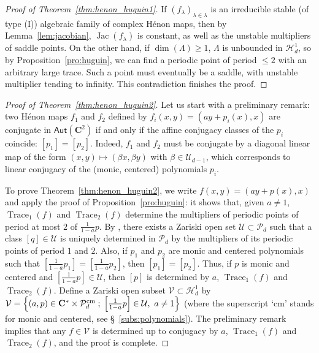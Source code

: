 \documentclass[oneside, 12pt]{amsart}
\newcommand{\set}[1]{\left\{#1\right\}}
\newcommand{\unsur}[1]{\frac{1}{#1}}
\newcommand{\inv}{^{-1}}
\DeclareMathOperator{\jac}{Jac}
\DeclareMathOperator{\Trace}{Trace}
\newcommand{\C}{\mathbf{C}}
\newcommand{\Aut}{\mathsf{Aut}}
\theoremstyle{plain}
\theoremstyle{definition}
\numberwithin{equation}{section}       %
\numberwithin{equation}{section}       %
\begin{document}
\begin{proof}[Proof of Theorem~\ref{thm:henon_huguin1}]
If $(f_\lambda)_{\lambda\in \lambda}$ is an irreducible stable (of type (I)) algebraic family of complex Hénon maps, 
then by Lemma~\ref{lem:jacobian}, $\jac(f_\lambda)$ is constant, as well as the unstable 
multipliers of saddle points. On the other hand, if  $\dim(\Lambda)\geq 1$, $\Lambda$ is unbounded in 
$\mathcal H^1_d$, so by Proposition~\ref{pro:huguin},   we can find a periodic point of period $\leq 2$ with 
an arbitrary large trace. Such a point must eventually be a saddle, with unstable multiplier tending to infinity. This contradiction finishes the proof. 
\end{proof}

\begin{proof}[Proof of Theorem~\ref{thm:henon_huguin2}] 
Let us start with a preliminary remark:  two Hénon maps $f_1$ and $f_2$ defined by 
$f_i(x,y)=(ay+p_i(x),x)$ are conjugate in $\Aut(\C^2)$ if and only if the affine conjugacy classes of the $p_i$ coincide: $[p_1] = [p_2]$.
Indeed, $f_1$ and $f_2$ must be  conjugate by a diagonal linear map of the form $(x,y)\mapsto (\beta x, \beta y)$ with $\beta\in \mathcal U_{d-1}$, which corresponds to linear conjugacy of the (monic, centered) polynomials $p_i$.  


To prove Theorem~\ref{thm:henon_huguin2}, we write $f(x,y) = (ay+p(x), x)$ and apply 
the proof of  Proposition~\ref{pro:huguin}: it shows that, given  $a\neq 1$,  
$\Trace_1(f)$ and $\Trace_2(f)$ determine the multipliers of periodic points of period at most $2$ of 
$\unsur{1-a}p$. By \cite[Thm C]{huguin:polynomials}, there exists a Zariski open set $\mathcal U\subset \mathcal P_d$ such that a class $[q]\in \mathcal U$  is uniquely 
determined in $\mathcal P_d$ by the multipliers of its periodic points of period $1$ and  $2$. 
Also, if $p_1$ and $p_2$ are monic and centered polynomials   such that 
$\left[\unsur{1-a}p_1\right]= \left[\unsur{1-a}p_2\right]$, then $[p_1] = [p_2]$. 
Thus, if $p$ is monic and centered and 
 $\left[\unsur{1-a}p\right]\in \mathcal U$, then  $[p]$ is determined by $a$, 
$\Trace_1(f)$ and $\Trace_2(f)$.  
Define a Zariski open subset $\mathcal V\subset \mathcal H^1_d$ by  
$\mathcal V= \set{(a,p)\in \C^*\times \mathcal P_d^{\rm cm}\; ; \;  \left[\unsur{1-a}p\right]\in \mathcal U,  \ a\neq 1}$  (where the superscript `cm' stands for monic and centered, see \S~\ref{subs:polynomials}).
The preliminary remark implies that  any $f \in \mathcal V$  is determined up to conjugacy by $a$, 
$\Trace_1(f)$ and $\Trace_2(f)$, and the proof is complete. 



\end{proof}
\end{document}
